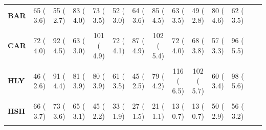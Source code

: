 \documentclass[
]{article}
\begin{document}
\begin{table}[H]
\begin{tabular}[t]{>{\raggedright\arraybackslash}p{5em}ccccccccccccc}
\textbf{BAR} & 65 (  3.6) & 55 (  2.7) & 83 (  4.0) & 73 (  3.5) & 52 (  3.0) & 64 (  3.6) & 85 (  4.5) & 63 (  3.5) & 49 (  2.8) & 80 (  4.6) & 62 (  3.5) &  & \\
\textbf{\cellcolor{gray!10}{BKH}} & \cellcolor{gray!10}{84 (  4.7)} & \cellcolor{gray!10}{57 (  2.8)} & \cellcolor{gray!10}{63 (  3.0)} & \cellcolor{gray!10}{50 (  2.4)} & \cellcolor{gray!10}{41 (  2.3)} & \cellcolor{gray!10}{36 (  2.0)} & \cellcolor{gray!10}{0 (  0.0)} & \cellcolor{gray!10}{0 (  0.0)} & \cellcolor{gray!10}{0 (  0.0)} & \cellcolor{gray!10}{0 (  0.0)} & \cellcolor{gray!10}{0 (  0.0)} & \cellcolor{gray!10}{} & \cellcolor{gray!10}{}\\
\textbf{CAR} & 72 (  4.0) & 92 (  4.5) & 63 (  3.0) & 101 (  4.9) & 72 (  4.1) & 87 (  4.9) & 102 (  5.4) & 72 (  4.0) & 68 (  3.8) & 57 (  3.3) & 96 (  5.5) &  & \\
\textbf{\cellcolor{gray!10}{HAS}} & \cellcolor{gray!10}{57 (  3.2)} & \cellcolor{gray!10}{46 (  2.2)} & \cellcolor{gray!10}{53 (  2.5)} & \cellcolor{gray!10}{46 (  2.2)} & \cellcolor{gray!10}{45 (  2.6)} & \cellcolor{gray!10}{28 (  1.6)} & \cellcolor{gray!10}{23 (  1.2)} & \cellcolor{gray!10}{29 (  1.6)} & \cellcolor{gray!10}{47 (  2.6)} & \cellcolor{gray!10}{44 (  2.5)} & \cellcolor{gray!10}{38 (  2.2)} & \cellcolor{gray!10}{} & \cellcolor{gray!10}{}\\
\textbf{HLY} & 46 (  2.6) & 91 (  4.4) & 81 (  3.9) & 80 (  3.9) & 61 (  3.5) & 45 (  2.5) & 79 (  4.2) & 116 (  6.5) & 102 (  5.7) & 60 (  3.4) & 98 (  5.6) &  & \\
\textbf{\cellcolor{gray!10}{HSE}} & \cellcolor{gray!10}{85 (  4.7)} & \cellcolor{gray!10}{42 (  2.1)} & \cellcolor{gray!10}{66 (  3.2)} & \cellcolor{gray!10}{80 (  3.9)} & \cellcolor{gray!10}{70 (  4.0)} & \cellcolor{gray!10}{65 (  3.7)} & \cellcolor{gray!10}{54 (  2.9)} & \cellcolor{gray!10}{85 (  4.7)} & \cellcolor{gray!10}{51 (  2.9)} & \cellcolor{gray!10}{62 (  3.5)} & \cellcolor{gray!10}{75 (  4.3)} & \cellcolor{gray!10}{} & \cellcolor{gray!10}{}\\
\textbf{HSH} & 66 (  3.7) & 73 (  3.6) & 65 (  3.1) & 45 (  2.2) & 33 (  1.9) & 27 (  1.5) & 21 (  1.1) & 13 (  0.7) & 13 (  0.7) & 50 (  2.9) & 56 (  3.2) &  & \\
\textbf{\cellcolor{gray!10}{ICH}} & \cellcolor{gray!10}{105 (  5.9)} & \cellcolor{gray!10}{117 (  5.7)} & \cellcolor{gray!10}{127 (  6.1)} & \cellcolor{gray!10}{139 (  6.7)} & \cellcolor{gray!10}{114 (  6.5)} & \cellcolor{gray!10}{110 (  6.2)} & \cellcolor{gray!10}{110 (  5.8)} & \cellcolor{gray!10}{104 (  5.8)} & \cellcolor{gray!10}{69 (  3.9)} & \cellcolor{gray!10}{52 (  3.0)} & \cellcolor{gray!10}{33 (  1.9)} & \cellcolor{gray!10}{} & \cellcolor{gray!10}{}\\

\end{tabular}
\end{table}
\end{document}
